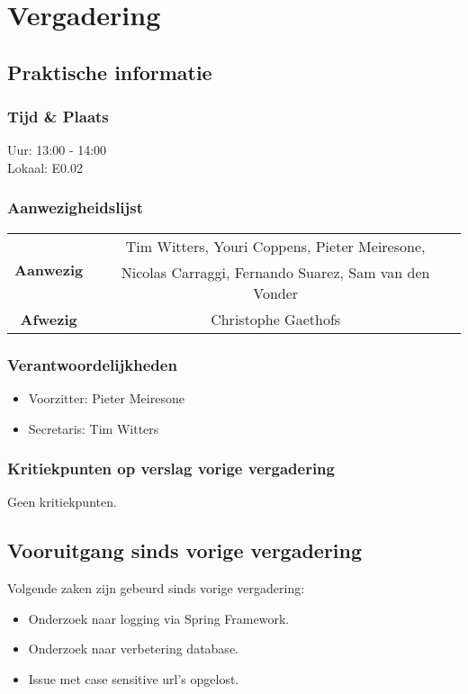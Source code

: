 \section{Vergadering \MeetingDate}
\subsection{Praktische informatie}
\subsubsection{Tijd \& Plaats}
Uur: 13:00 - 14:00
\\
Lokaal: E0.02
\subsubsection{Aanwezigheidslijst}
\begin{table}[htbp]
	\centering
	\begin{tabular}{c|c}
		\multirow{2}{*}{\textbf{Aanwezig}} & Tim Witters, Youri Coppens, Pieter Meiresone, \\
		& Nicolas Carraggi, Fernando Suarez, Sam van den Vonder \\
		\hline
		\textbf{Afwezig} & Christophe Gaethofs \\
	\end{tabular}
\end{table}

\subsubsection{Verantwoordelijkheden}
\begin{itemize}
	\item Voorzitter: Pieter Meiresone
	\item Secretaris: Tim Witters
\end{itemize}

\subsubsection{Kritiekpunten op verslag vorige vergadering}
Geen kritiekpunten.

\subsection{Vooruitgang sinds vorige vergadering}
Volgende zaken zijn gebeurd sinds vorige vergadering:
\begin{itemize}
	\item Onderzoek naar logging via Spring Framework.
	\item Onderzoek naar verbetering database.
	\item Issue met case sensitive url's opgelost.
\end{itemize}

